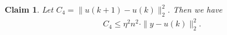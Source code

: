 \documentclass[11pt]{article}
\newtheorem{claim}[theorem]{Claim}
\begin{document}
\begin{claim}\label{cla:C4}
Let $C_4  = \| u (k+1) - u(k) \|_2^2$. Then we have
\begin{align*}
C_4 \leq \eta^2 n^2 \cdot \| y - u(k) \|_2^2.
\end{align*}
\end{claim}








\end{document}
